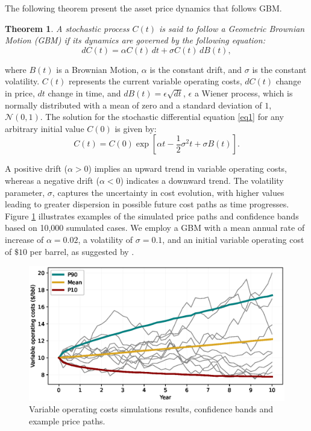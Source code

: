 \documentclass[pdflatex,sn-basic]{sn-jnl}%
\theoremstyle{thmstyleone}%
\newtheorem{theorem}{Theorem}%
\theoremstyle{thmstyletwo}%
\theoremstyle{thmstylethree}%
\begin{document}
The following theorem present the asset price dynamics that follows GBM.

\begin{theorem}
\theoremstyle{thmstyletwo}
A stochastic process $C(t)$ is said to follow a Geometric Brownian Motion (GBM) if its dynamics are governed by the following equation: 
\begin{equation}
dC(t) = \alpha C(t)\,dt + \sigma C(t)\,dB(t),
\label{eq1}
\end{equation}
\end{theorem} 
\noindent
where $B(t)$ is a Brownian Motion, $\alpha$ is the constant drift, and $\sigma$ is the constant volatility. $C(t)$ represents the current variable operating costs, $dC(t)$ change in price, $dt$ change in time, and $dB(t)=\epsilon \sqrt{dt}$, $\epsilon$ a Wiener process, which is normally distributed with a mean of zero and a standard deviation of $1$, $\mathcal{N}(0, 1)$. The solution for the stochastic differential equation \ref{eq1} for any arbitrary initial value $C(0)$ is given by:
\begin{equation}
C(t) = C(0) \exp\left[ \alpha t - \frac{1}{2} \sigma^2 t + \sigma B(t) \right].
\label{eq2}
\end{equation}

A positive drift ($\alpha > 0$) implies an upward trend in variable operating costs, whereas a negative drift ($\alpha < 0$) indicates a downward trend. The volatility parameter, $\sigma$, captures the uncertainty in cost evolution, with higher values leading to greater dispersion in possible future cost paths as time progresses. Figure \ref{fig10} illustrates examples of the simulated price paths and confidence bands based on 10,000 sumulated cases. We employ a GBM with a mean annual rate of increase of $\alpha=0.02$, a volatility of $\sigma=0.1$, and an initial variable operating cost of $\$10$ per barrel, as suggested by \cite{ref12}.

\begin{figure}[H]
\centering
\begin{minipage}{0.95\textwidth}
  \includegraphics[width=\textwidth]{VOC_profile.eps}
  \caption{Variable operating costs simulations results, confidence bands and example price paths.}
  \label{fig10}
\end{minipage}
\end{figure}
\end{document}
